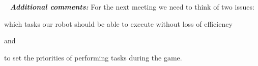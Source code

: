 	 \newline
	\textit{\textbf{Additional comments:}} For the next meeting we need to think of two issues:
	\begin{enumerate*}
		\item which tasks our robot should be able to execute without loss of efficiency
		
		and
		
		\item to set the priorities of performing tasks during the game.
		
	\end{enumerate*}
	
	
	
